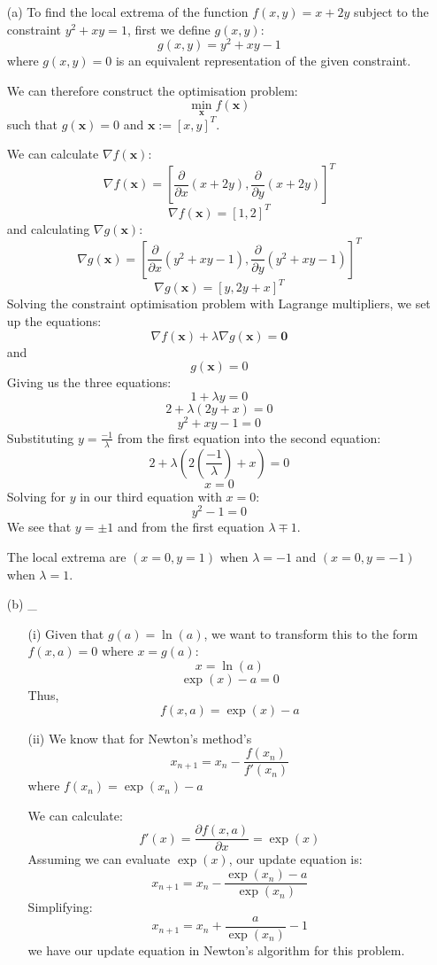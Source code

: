 \documentclass[12pt]{article}
\begin{document}
\begin{enumerate}
\item[(a)] To find the local extrema of the function $f(x,y) = x + 2y$ subject to the constraint $y^2 + xy = 1$, first we define $g(x, y)$:
$$g(x, y) = y^2 + xy - 1$$
where $g(x, y)=0$ is an equivalent representation of the given constraint.

We can therefore construct the optimisation problem:
$$\min_{\textbf{x}} f(\textbf{x})$$
such that $g(\textbf{x})=0$ and $\textbf{x} := [x, y]^T$.

We can calculate $\nabla f(\textbf{x})$:
$$\nabla f(\textbf{x}) = [\frac{\partial}{\partial x} (x+2y), \frac{\partial}{\partial y} (x+2y)]^T$$
$$\nabla f(\textbf{x}) = [1, 2]^T$$
and calculating $\nabla g(\textbf{x})$:
$$\nabla g(\textbf{x}) = [\frac{\partial}{\partial x} (y^2 + xy - 1), \frac{\partial}{\partial y} (y^2 + xy - 1)]^T$$
$$\nabla g(\textbf{x}) = [y, 2y+x]^T$$
Solving the constraint optimisation problem with Lagrange multipliers, we set up the equations:
$$\nabla f(\textbf{x})+\lambda \nabla g(\textbf{x}) = \textbf{0}$$
and
$$g(\textbf{x}) = 0$$
Giving us the three equations:
$$1+\lambda y = 0$$
$$2+\lambda (2y+x)= 0$$
$$y^2 + xy - 1 = 0$$
Substituting $ y = \frac{-1}{\lambda}$ from the first equation into the second equation:
$$2+\lambda(2(\frac{-1}{\lambda}) + x) = 0$$
$$x = 0$$
Solving for $y$ in our third equation with $x=0$:
$$y^2-1=0$$
We see that $y=\pm 1$ and from the first equation $\lambda\mp 1$.

The local extrema are $(x=0, y=1)$ when $\lambda=-1$ and $(x=0, y=-1)$ when $\lambda=1$.

\item[(b)] _
\begin{enumerate}
             \item[(i)] Given that $g(a) = \ln(a)$, we want to transform this to the form $f(x,a)=0$ where $x=g(a)$:
             $$x = \ln(a)$$
             $$\exp(x) - a = 0$$
             Thus,
             $$f(x, a) = \exp(x) - a$$
  \item[(ii)] We know that for Newton's method's
             $$x_{n+1} = x_{n} - \frac{f(x_n)}{f'(x_n)}$$
             where $f(x_n) = \exp(x_n) - a$

             We can calculate:
             $$f'(x) = \frac{\partial f(x, a)}{\partial x}= \exp(x)$$
             Assuming we can evaluate $\exp(x)$, our update equation is:
             $$x_{n+1} = x_{n} - \frac{\exp(x_n) - a}{\exp(x_n)}$$
             Simplifying:
             $$x_{n+1} = x_{n} + \frac{a}{\exp(x_n)} - 1$$
             we have our update equation in Newton's algorithm for this problem.
\end{enumerate}
\end{enumerate}
\end{document}
